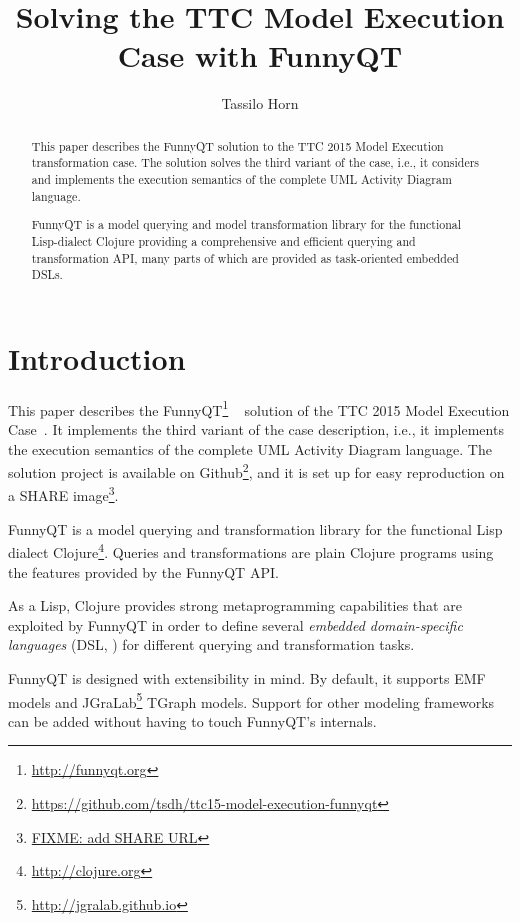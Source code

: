 \documentclass[submission]{eptcs}
\title{Solving the TTC Model Execution Case with FunnyQT}
\author{Tassilo Horn
  \institute{Institute for Software Technology, University Koblenz-Landau, Germany}
  \email{horn@uni-koblenz.de}}
\begin{document}
\maketitle

\begin{abstract}
  This paper describes the FunnyQT solution to the TTC 2015 Model Execution
  transformation case.  The solution solves the third variant of the case,
  i.e., it considers and implements the execution semantics of the complete UML
  Activity Diagram language.

  FunnyQT is a model querying and model transformation library for the
  functional Lisp-dialect Clojure providing a comprehensive and efficient
  querying and transformation API, many parts of which are provided as
  task-oriented embedded DSLs.
\end{abstract}


\section{Introduction}
\label{sec:introduction}

This paper describes the FunnyQT\footnote{\url{http://funnyqt.org}}
~\cite{Horn2013MQWFQ} solution of the TTC 2015 Model Execution
Case~\cite{model-execution-case-desc}.  It implements the third variant of the
case description, i.e., it implements the execution semantics of the complete
UML Activity Diagram language.  The solution project is available on
Github\footnote{\url{https://github.com/tsdh/ttc15-model-execution-funnyqt}},
and it is set up for easy reproduction on a SHARE image\footnote{\url{FIXME:
    add SHARE URL}}.

FunnyQT is a model querying and transformation library for the functional Lisp
dialect Clojure\footnote{\url{http://clojure.org}}.  Queries and
transformations are plain Clojure programs using the features provided by the
FunnyQT API.

As a Lisp, Clojure provides strong metaprogramming capabilities that are
exploited by FunnyQT in order to define several \emph{embedded domain-specific
  languages} (DSL, \cite{book:Fowler2010DSL}) for different querying and
transformation tasks.

FunnyQT is designed with extensibility in mind.  By default, it supports EMF
\cite{Steinberg2008EEM} models and
JGraLab\footnote{\url{http://jgralab.github.io}} TGraph models.  Support for
other modeling frameworks can be added without having to touch FunnyQT's
internals.
\end{document}
